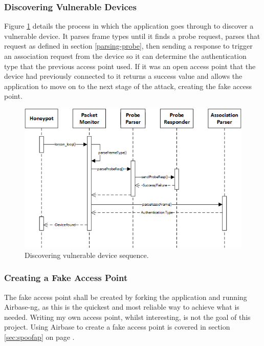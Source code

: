 \subsubsection{Discovering Vulnerable Devices}
\label{open-auth}
Figure \ref{fig:discover_device_seq} details the process in which the application goes through to discover a vulnerable device. It parses frame types until it finds a probe request, parses that request as defined in section \ref{parsing-probe}, then sending a response to trigger an association request from the device so it can determine the authentication type that the previous access point used. If it was an open access point that the device had previously connected to it returns a success value and allows the application to move on to the next  stage of the attack, creating the fake access point.
\clearpage
\begin{figure}[h!]
\centering\includegraphics[width=\linewidth]{design/figures/discover-device-seq.png}
\caption{Discovering vulnerable device sequence.}
\label{fig:discover_device_seq}
\end{figure}

\subsubsection{Creating a Fake Access Point}
\label{design:create-ap}
The fake access point shall be created by forking the application and running Airbase-ng, as this is the quickest and most reliable way to achieve what is needed. Writing my own access point, whilst interesting, is not the goal of this project. Using Airbase to create a fake access point is covered in section \ref{sec:spoofap} on page \pageref{sec:spoofap}.



